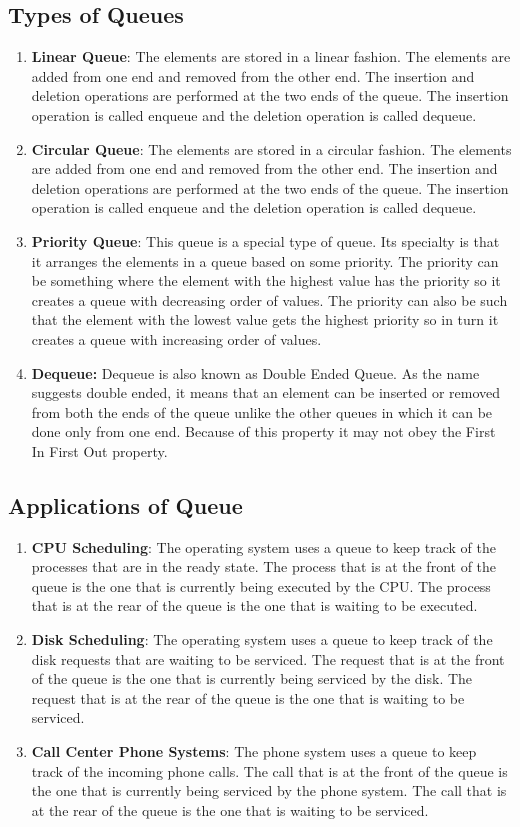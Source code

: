 \documentclass[11pt]{article}
\begin{document}
\subsection{Types of Queues}
\begin{enumerate}
	\item \textbf{Linear Queue}: The elements are stored in a linear fashion. The elements are added from one end and removed from the other end. The insertion and deletion operations are performed at the two ends of the queue. The insertion operation is called enqueue and the deletion operation is called dequeue.
	\item \textbf{Circular Queue}: The elements are stored in a circular fashion. The elements are added from one end and removed from the other end. The insertion and deletion operations are performed at the two ends of the queue. The insertion operation is called enqueue and the deletion operation is called dequeue.
	\item \textbf{Priority Queue}: This queue is a special type of queue. Its specialty is that it arranges the elements in a queue based on some priority. The priority can be something where the element with the highest value has the priority so it creates a queue with decreasing order of values. The priority can also be such that the element with the lowest value gets the highest priority so in turn it creates a queue with increasing order of values.
	\item \textbf{Dequeue:} Dequeue is also known as Double Ended Queue. As the name suggests double ended, it means that an element can be inserted or removed from both the ends of the queue unlike the other queues in which it can be done only from one end. Because of this property it may not obey the First In First Out property. 
\end{enumerate}

\subsection{Applications of Queue}
\begin{enumerate}
	\item \textbf{CPU Scheduling}: The operating system uses a queue to keep track of the processes that are in the ready state. The process that is at the front of the queue is the one that is currently being executed by the CPU. The process that is at the rear of the queue is the one that is waiting to be executed.
	\item \textbf{Disk Scheduling}: The operating system uses a queue to keep track of the disk requests that are waiting to be serviced. The request that is at the front of the queue is the one that is currently being serviced by the disk. The request that is at the rear of the queue is the one that is waiting to be serviced.
	\item \textbf{Call Center Phone Systems}: The phone system uses a queue to keep track of the incoming phone calls. The call that is at the front of the queue is the one that is currently being serviced by the phone system. The call that is at the rear of the queue is the one that is waiting to be serviced.
\end{enumerate}
\end{document}
